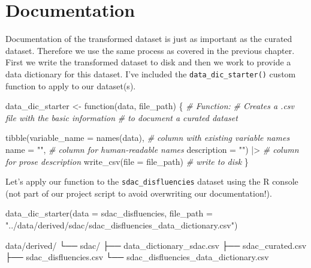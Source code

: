\documentclass[
  letterpaper,
]{latex/krantz}
\newenvironment{Shaded}{\begin{snugshade}}{\end{snugshade}}
\newcommand{\AttributeTok}[1]{\textcolor[rgb]{0.00,0.00,0.00}{#1}}
\newcommand{\CommentTok}[1]{\textcolor[rgb]{0.00,0.00,0.00}{\textit{#1}}}
\newcommand{\ControlFlowTok}[1]{\textcolor[rgb]{0.00,0.00,0.00}{#1}}
\newcommand{\ExtensionTok}[1]{\textcolor[rgb]{0.00,0.00,0.00}{#1}}
\newcommand{\FunctionTok}[1]{\textcolor[rgb]{0.00,0.00,0.00}{#1}}
\newcommand{\NormalTok}[1]{\textcolor[rgb]{0.00,0.00,0.00}{#1}}
\newcommand{\OtherTok}[1]{\textcolor[rgb]{0.00,0.00,0.00}{#1}}
\newcommand{\SpecialCharTok}[1]{\textcolor[rgb]{0.00,0.00,0.00}{#1}}
\newcommand{\StringTok}[1]{\textcolor[rgb]{0.00,0.00,0.00}{#1}}
\begin{document}
\hypertarget{documentation-3}{%
\section{Documentation}\label{documentation-3}}

Documentation of the transformed dataset is just as important as the
curated dataset. Therefore we use the same process as covered in the
previous chapter. First we write the transformed dataset to disk and
then we work to provide a data dictionary for this dataset. I've
included the \texttt{data\_dic\_starter()} custom function to apply to
our dataset(s).

\begin{Shaded}
\begin{Highlighting}[]
\NormalTok{data\_dic\_starter }\OtherTok{\textless{}{-}} \ControlFlowTok{function}\NormalTok{(data, file\_path) \{}
  \CommentTok{\# Function:}
  \CommentTok{\# Creates a .csv file with the basic information}
  \CommentTok{\# to document a curated dataset}
  
  \FunctionTok{tibble}\NormalTok{(}\AttributeTok{variable\_name =} \FunctionTok{names}\NormalTok{(data), }\CommentTok{\# column with existing variable names }
       \AttributeTok{name =} \StringTok{""}\NormalTok{, }\CommentTok{\# column for human{-}readable names}
       \AttributeTok{description =} \StringTok{""}\NormalTok{) }\SpecialCharTok{|\textgreater{}} \CommentTok{\# column for prose description}
  \FunctionTok{write\_csv}\NormalTok{(}\AttributeTok{file =}\NormalTok{ file\_path) }\CommentTok{\# write to disk}
\NormalTok{\}}
\end{Highlighting}
\end{Shaded}

Let's apply our function to the \texttt{sdac\_disfluencies} dataset
using the R console (not part of our project script to avoid overwriting
our documentation!).

\begin{Shaded}
\begin{Highlighting}[]
\FunctionTok{data\_dic\_starter}\NormalTok{(}\AttributeTok{data =}\NormalTok{ sdac\_disfluencies, }\AttributeTok{file\_path =} \StringTok{"../data/derived/sdac/sdac\_disfluencies\_data\_dictionary.csv"}\NormalTok{)}
\end{Highlighting}
\end{Shaded}

\begin{Shaded}
\begin{Highlighting}[]
\ExtensionTok{data/derived/}
\ExtensionTok{└──}\NormalTok{ sdac/}
    \ExtensionTok{├──}\NormalTok{ data\_dictionary\_sdac.csv}
    \ExtensionTok{├──}\NormalTok{ sdac\_curated.csv}
    \ExtensionTok{├──}\NormalTok{ sdac\_disfluencies.csv}
    \ExtensionTok{└──}\NormalTok{ sdac\_disfluencies\_data\_dictionary.csv}
\end{Highlighting}
\end{Shaded}
\end{document}
